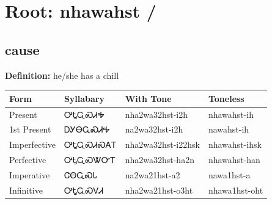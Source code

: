 \documentclass{article}%
\begin{document}
%
\normalsize%
\section*{Root: nhawahst / }%
\subsection*{cause}%
\textbf{Definition: }%
he/she has a chill%
\\[0.5em]%
\begin{tabular}{|l|l|l|l|}%
\hline%
\textbf{Form}&\textbf{Syllabary}&\textbf{With Tone}&\textbf{Toneless}\\%
\hline%
Present&ᎤᎿᏩᏍᏗᎭ&nha2wa32hst{-}i2h&nhawahst{-}ih\\%
1st Present&ᎠᎩᎾᏩᏍᏗᎭ&na2wa32hst{-}i2h&nawahst{-}ih\\%
Imperfective&ᎤᎿᏩᏍᏗᏍᎪᎢ&nha2wa32hst{-}i22hsk&nhawahst{-}ihsk\\%
Perfective&ᎤᎿᏩᏍᏔᏅᎢ&nha2wa32hst{-}ha2n&nhawahst{-}han\\%
Imperative&ᏣᎾᏩᏍᏓ&na2wa21hst{-}a2&nawa1hst{-}a\\%
Infinitive&ᎤᎿᏩᏍᏙᏗ&nha2wa21hst{-}o3ht&nhawa1hst{-}oht\\%
\hline%
\end{tabular}%
\\[1em]%
\end{document}
